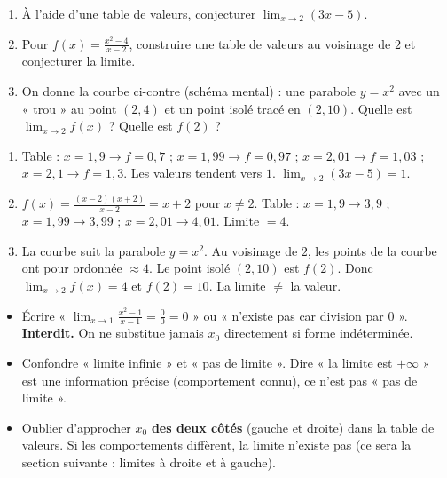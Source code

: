 \documentclass[11pt]{article}
\begin{document}
\begin{exercice}
\begin{enumerate}
    \item À l'aide d'une table de valeurs, conjecturer $\lim_{x \to 2} (3x - 5)$.
    \item Pour $f(x) = \frac{x^2 - 4}{x - 2}$, construire une table de valeurs au voisinage de $2$ et conjecturer la limite.
    \item On donne la courbe ci-contre (schéma mental) : une parabole $y = x^2$ avec un « trou » au point $(2, 4)$ et un point isolé tracé en $(2, 10)$. Quelle est $\lim_{x \to 2} f(x)$ ? Quelle est $f(2)$ ?
\end{enumerate}
\end{exercice}

\begin{corrige}[Exercice n°1]
\begin{enumerate}
    \item Table : $x=1,9 \to f=0,7$ ; $x=1,99 \to f=0,97$ ; $x=2,01 \to f=1,03$ ; $x=2,1 \to f=1,3$. Les valeurs tendent vers $1$. $\lim_{x \to 2} (3x-5) = 1$.
    \item $f(x) = \frac{(x-2)(x+2)}{x-2} = x+2$ pour $x \neq 2$. Table : $x=1,9 \to 3,9$ ; $x=1,99 \to 3,99$ ; $x=2,01 \to 4,01$. Limite $= 4$.
    \item La courbe suit la parabole $y=x^2$. Au voisinage de $2$, les points de la courbe ont pour ordonnée $\approx 4$. Le point isolé $(2,10)$ est $f(2)$. Donc $\lim_{x \to 2} f(x) = 4$ et $f(2) = 10$. La limite $\neq$ la valeur.
\end{enumerate}
\end{corrige}

\begin{attention}
\begin{itemize}
    \item Écrire « $\lim_{x \to 1} \frac{x^2-1}{x-1} = \frac{0}{0} = 0$ » ou « n'existe pas car division par 0 ». \textbf{Interdit.} On ne substitue jamais $x_0$ directement si forme indéterminée.
    \item Confondre « limite infinie » et « pas de limite ». Dire « la limite est $+\infty$ » est une information précise (comportement connu), ce n'est pas « pas de limite ».
    \item Oublier d'approcher $x_0$ \textbf{des deux côtés} (gauche et droite) dans la table de valeurs. Si les comportements diffèrent, la limite n'existe pas (ce sera la section suivante : limites à droite et à gauche).
\end{itemize}
\end{attention}
\end{document}
